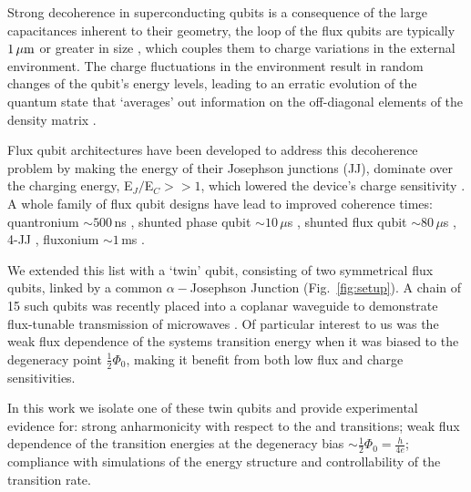 Strong  decoherence in  superconducting  qubits is  a consequence  of  the large  capacitances
inherent   to    their   geometry,   the   loop    of   the   flux   qubits    are   typically
$           1\,\mu\text{m}$            or           greater            in           size
\cite{Astafiev2010}\cite{hoi2011}\cite{johnson2010}, which  couples them to  charge variations
in the  external environment.   The charge  fluctuations in the  environment result  in random
changes of  the qubit's energy levels,  leading to an  erratic evolution of the  quantum state
that  `averages'  out  information  on  the   off-diagonal  elements  of  the  density  matrix
\cite{devoret2008}.
 
Flux qubit architectures have been developed to address this decoherence problem by making the
energy of their Josephson junctions (JJ), dominate over the charging energy, E$_J/$E$_C >> 1$,
which  lowered   the  device's  charge  sensitivity   \cite{orlando1999}  \cite{chiorescu2003}
\cite{mooij1999}.  A whole family of flux qubit designs have lead to improved coherence times:
quantronium  $\sim500\,$ns  \cite{cottet2002}  \cite{gu2017},  shunted  phase  qubit  $\sim10\,\mu  $s
\cite{stern2014}  ,  shunted  flux  qubit  $\sim80\,\mu$s  \cite{yan2016}  ,  4-JJ  \cite{qui2016},
fluxonium $\sim1\,$ms \cite{pop2014}.
 
We extended this list  with a `twin' qubit, consisting of two  symmetrical flux qubits, linked
by a  common $ \alpha-$Josephson  Junction (Fig.~\ref{fig:setup}).  A chain  of 15 such  qubits was
recently  placed  into  a  coplanar  waveguide to  demonstrate  flux-tunable  transmission  of
microwaves \cite{shulga2018}.   Of particular interest to  us was the weak  flux dependence of
the systems transition  energy when it was  biased to the degeneracy  point $\frac{1}{2}\Phi_0 $,
making it benefit from both low flux and charge sensitivities.
 
In this work we isolate one of these twin qubits and provide experimental evidence for: strong
anharmonicity with respect to the \ilra{} and \ilra{} transitions;
weak   flux    dependence   of    the   transition   energies    at   the    degeneracy   bias
$\sim \frac{1}{2}\Phi_0 =  \frac{h}{4e}$; compliance with simulations of  the energy structure
and controllability of the ~\ilra~ transition rate.

